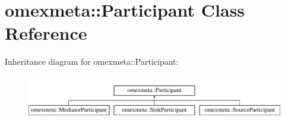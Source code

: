 \hypertarget{classomexmeta_1_1Participant}{}\section{omexmeta\+:\+:Participant Class Reference}
\label{classomexmeta_1_1Participant}
Inheritance diagram for omexmeta\+:\+:Participant\+:\begin{figure}[H]
\begin{center}
\leavevmode
\includegraphics[height=1.954625cm]{classomexmeta_1_1Participant}
\end{center}
\end{figure}
